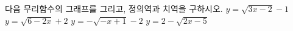 다음 무리함수의 그래프를 그리고, 정의역과 치역을 구하시오.
 $y=\sqrt{3x-2}-1$
 $y=\sqrt{6-2x}+2$
 $y=-\sqrt{-x+1}-2$
 $y=2-\sqrt{2x-5}$
